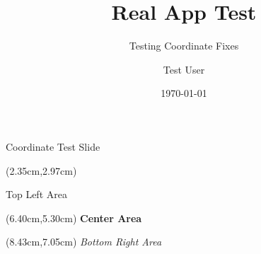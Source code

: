 \documentclass[aspectratio=169,xcolor=dvipsnames,professionalfonts]{beamer}
\title{Real App Test}
\subtitle{Testing Coordinate Fixes}
\author{Test User}
\institute{Test Institution}
\date{\today}
\begin{document}
\begin{frame}
\titlepage
\end{frame}

\begin{frame}{Coordinate Test Slide}

\begin{textblock*}{2.70cm}(2.35cm,2.97cm)
{\fontsize{16}{19.2}\selectfont\raggedright Top Left Area}
\end{textblock*}

\begin{textblock*}{2.70cm}(6.40cm,5.30cm)
{\fontsize{18}{21.599999999999998}\selectfont\bfseries \color{primary} \centering Center Area}
\end{textblock*}

\begin{textblock*}{2.70cm}(8.43cm,7.05cm)
{\fontsize{14}{16.8}\selectfont\itshape \color{secondary} \raggedleft Bottom Right Area}
\end{textblock*}
\end{frame}
\end{document}
